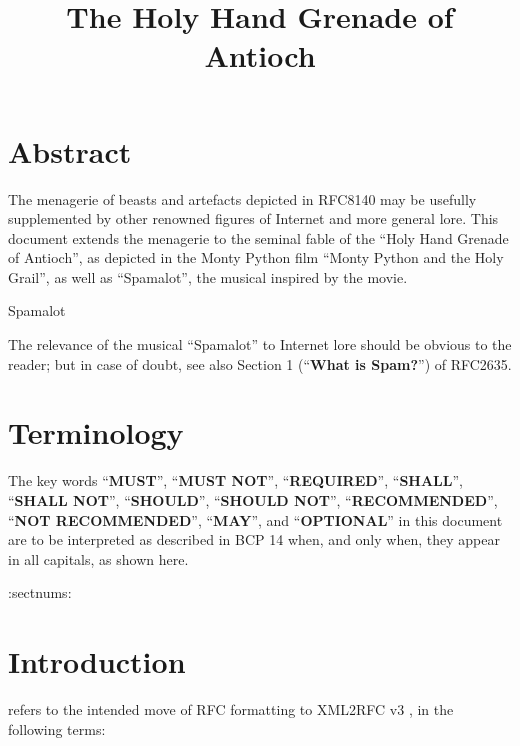 \documentclass{metanorma}
\title{The Holy Hand Grenade of Antioch}
\begin{document}
\maketitle

\tableofcontents


\section{Abstract}

The menagerie of beasts and artefacts depicted in RFC8140
may be usefully supplemented by other renowned figures of
Internet and more general lore. This document extends the
menagerie to the seminal fable of the
``Holy Hand Grenade of Antioch'', as depicted in the
Monty Python film ``Monty Python and the Holy Grail'',
as well as ``Spamalot'', the musical inspired by the movie.

\begin{note}
  \caption{Spamalot}
  The relevance of the musical ``Spamalot'' to Internet lore should be
  obvious to the reader; but in case of doubt, see also
  Section 1 (``\textbf{What is Spam?}'') of RFC2635.
\end{note}



\section{Terminology}

The key words ``\textbf{MUST}'', ``\textbf{MUST NOT}'', ``\textbf{REQUIRED}'', ``\textbf{SHALL}'',
``\textbf{SHALL NOT}'', ``\textbf{SHOULD}'', ``\textbf{SHOULD NOT}'', ``\textbf{RECOMMENDED}'',
``\textbf{NOT RECOMMENDED}'', ``\textbf{MAY}'', and ``\textbf{OPTIONAL}'' in this document
are to be interpreted as described in BCP 14  
when, and only when, they appear in all capitals, as shown here.

:sectnums:
\section{Introduction}

 refers to the intended move of RFC formatting to
XML2RFC v3 , in the following terms:
\end{document}
